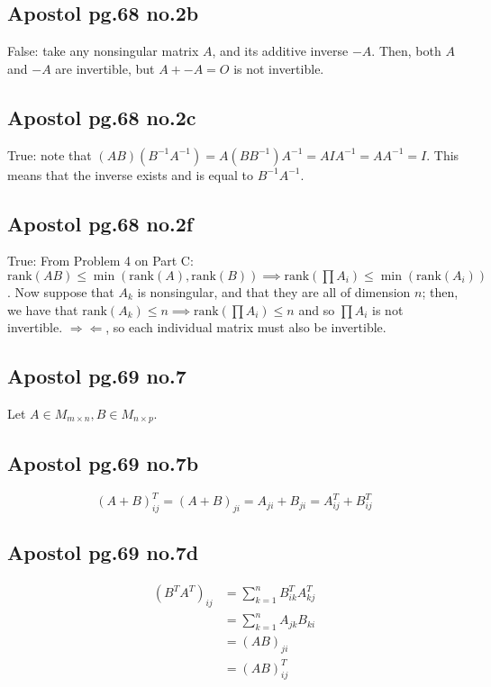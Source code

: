 \documentclass[12pt,letterpaper]{article}
\theoremstyle{definition}
\newcommand{\contra}{\Rightarrow\!\Leftarrow}
\newcommand{\rank}{\mathrm{rank}}
\begin{document}
\subsection*{Apostol pg.68 no.2b}

False: take any nonsingular matrix $A$, and its additive inverse $-A$. Then,
both $A$ and $-A$ are invertible, but $A + -A = O$ is not invertible. 

\subsection*{Apostol pg.68 no.2c}

True: note that $(AB)(B^{-1}A^{-1}) = A(BB^{-1})A^{-1} = AIA^{-1} = AA^{-1} =
I$. This means that the inverse exists and is equal to $B^{-1}A^{-1}$.

\subsection*{Apostol pg.68 no.2f}

True: From Problem 4 on Part C: $\rank(AB) \leq \min(\rank(A), \rank(B)) \implies
\rank(\prod A_i) \leq \min(\rank(A_i))$. Now suppose that $A_k$ is nonsingular,
and that they are all of dimension $n$; then,  we have that $\rank(A_k) \leq n
\implies \rank(\prod A_i) \leq n$ and so $\prod A_i$ is not invertible.
$\contra$, so each individual matrix must also be invertible.

\subsection*{Apostol pg.69 no.7}

Let $A \in M_{m \times n}, B \in M_{n \times p}$.

\subsection*{Apostol pg.69 no.7b}

\[
  (A+B)^T_{ij} = (A+B)_{ji} = A_{ji} + B_{ji} = A^T_{ij} + B^T_{ij}
\]

\subsection*{Apostol pg.69 no.7d}
\begin{align*}
  (B^TA^T)_{ij} &= \sum_{k=1}^nB^T_{ik}A^T_{kj} \\
                &= \sum_{k=1}^nA_{jk}B_{ki} \\
                &= (AB)_{ji} \\
                &= (AB)^T_{ij}
\end{align*}
\end{document}
